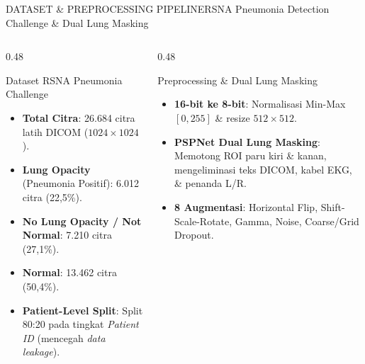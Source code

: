 \documentclass[aspectratio=169,11pt]{beamer}
\begin{document}
\begin{frame}{DATASET \& PREPROCESSING PIPELINE}{RSNA Pneumonia Detection Challenge \& Dual Lung Masking}
\begin{columns}[T]
  \begin{column}{0.48\textwidth}
    \begin{block}{\footnotesize Dataset RSNA Pneumonia Challenge}
      \begin{itemize}\scriptsize
        \item \textbf{Total Citra}: 26.684 citra latih DICOM ($1024 \times 1024$).
        \item \textbf{Lung Opacity} (Pneumonia Positif): 6.012 citra (22,5\%).
        \item \textbf{No Lung Opacity / Not Normal}: 7.210 citra (27,1\%).
        \item \textbf{Normal}: 13.462 citra (50,4\%).
        \item \textbf{Patient-Level Split}: Split 80:20 pada tingkat \textit{Patient ID} (mencegah \textit{data leakage}).
      \end{itemize}
    \end{block}
  \end{column}

  \begin{column}{0.48\textwidth}
    \begin{block}{\footnotesize Preprocessing \& Dual Lung Masking}
      \begin{itemize}\scriptsize
        \item \textbf{16-bit ke 8-bit}: Normalisasi Min-Max $[0, 255]$ \& resize $512 \times 512$.
        \item \textbf{PSPNet Dual Lung Masking}: Memotong ROI paru kiri \& kanan, mengeliminasi teks DICOM, kabel EKG, \& penanda L/R.
        \item \textbf{8 Augmentasi}: Horizontal Flip, Shift-Scale-Rotate, Gamma, Noise, Coarse/Grid Dropout.
      \end{itemize}
    \end{block}
  \end{column}
\end{columns}
\end{frame}
\end{document}

